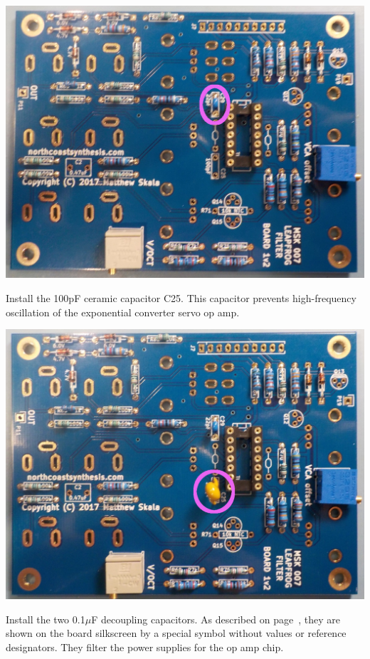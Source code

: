 \nopagebreak
\noindent\includegraphics[width=\linewidth]{cap-22p1.jpg}

Install the 100pF ceramic capacitor C25.  This capacitor prevents
high-frequency oscillation of the exponential converter servo op amp.

\nopagebreak
\noindent\includegraphics[width=\linewidth]{cap-100p1.jpg}

\pagebreak

Install the two 0.1$\mu$F decoupling capacitors.  As described on
page~\pageref{pag:decoup-symbol}, they are shown on the board silkscreen by
a special symbol without values or reference designators.  They filter the
power supplies for the op amp chip.

